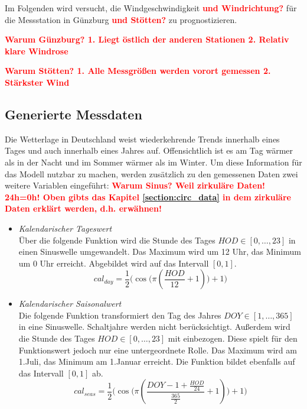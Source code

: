 \documentclass[
12pt, %
toc=listofnumbered, %
toc=chapterentrydotfill, %
numbers=noenddot, %
captions=tableheading, %
bibliography=numbered
]{scrreprt}
\let\Oldsubsection\subsection
\renewcommand{\subsection}{\FloatBarrier\Oldsubsection}
\newcommand{\highlight}[1]{\textbf{\textcolor{red}{#1}}}
\begin{document}
Im Folgenden wird versucht, die Windgeschwindigkeit \highlight{und Windrichtung?} für die Messstation in Günzburg \highlight{und Stötten?} zu prognostizieren. 

\highlight{Warum Günzburg? 1. Liegt östlich der anderen Stationen 2. Relativ klare Windrose}

\highlight{Warum Stötten? 1. Alle Messgrößen werden vorort gemessen 2. Stärkster Wind}

\subsection{Generierte Messdaten}\label{section:gen_daten}
Die Wetterlage in Deutschland weist wiederkehrende Trends innerhalb eines Tages und auch innerhalb eines Jahres auf. Offensichtlich ist es am Tag wärmer als in der Nacht und im Sommer wärmer als im Winter. Um diese Information für das Modell nutzbar zu machen, werden zusätzlich zu den gemessenen Daten zwei weitere Variablen eingeführt: \highlight{Warum Sinus? Weil zirkuläre Daten! 24h=0h! Oben gibts das Kapitel \ref{section:circ_data} in dem zirkuläre Daten erklärt werden, d.h. erwähnen!}

\begin{itemize}
	\item \textit{Kalendarischer Tageswert}\\
	Über die folgende Funktion wird die Stunde des Tages $HOD \in [0, \dots, 23]$ in einen Sinuswelle umgewandelt. Das Maximum wird um 12 Uhr, das Minimum um 0 Uhr erreicht. Abgebildet wird auf das Intervall $[0,1]$.
	\begin{equation}\label{eq:cal_day}
		cal_{day} = \frac{1}{2}\Big(\cos \big(\pi (\frac{HOD}{12}+ 1)\big) + 1 \Big)
	\end{equation}
	\item \textit{Kalendarischer Saisonalwert}\\
	Die folgende Funktion transformiert den Tag des Jahres $DOY \in [1, \dots, 365]$ in eine Sinuswelle. Schaltjahre werden nicht berücksichtigt. Außerdem wird die Stunde des Tages $HOD \in [0, \dots, 23]$ mit einbezogen. Diese spielt für den Funktionswert jedoch nur eine untergeordnete Rolle. Das Maximum wird am 1.Juli, das Minimum am 1.Januar erreicht. Die Funktion bildet ebenfalls auf das Intervall $[0,1]$ ab.
	\begin{equation}\label{eq:cal_seas}
		cal_{seas} = \frac{1}{2}\Big(\cos\big(\pi (\frac{DOY -1 + \frac{HOD}{24}}{\frac{365}{2}}+ 1)\big) + 1\Big)
	\end{equation}
	
\end{itemize}
\end{document}
